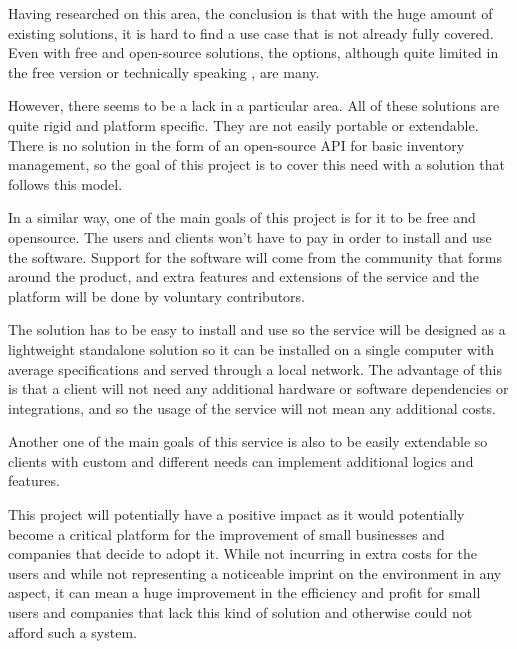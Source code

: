 Having researched on this area, the conclusion is that with the huge amount of existing solutions, it is hard to find a use case that is not already fully covered. Even with free and open-source solutions, the options, although quite limited \cite{4,5} in the free version or technically speaking \cite{6}, are many.

However, there seems to be a lack in a particular area. All of these solutions are quite rigid and platform specific. They are not easily portable or extendable. There is no solution in the form of an open-source API for basic inventory management, so the goal of this project is to cover this need with a solution that follows this model.

In a similar way, one of the main goals of this project is for it to be free and opensource. The users and clients won't have to pay in order to install and use the software. Support for the software will come from the community that forms around the product, and extra features and extensions of the service and the platform will be done by voluntary contributors.

The solution has to be easy to install and use so the service will be designed as a lightweight standalone solution so it can be installed on a single computer with average specifications and served through a local network. The advantage of this is that a client will not need any additional hardware or software dependencies or integrations, and so the usage of the service will not mean any additional costs.

Another one of the main goals of this service is also to be easily extendable so clients with custom and different needs can implement additional logics and features.

This project will potentially have a positive impact as it would potentially become a critical platform for the improvement of small businesses and companies that decide to adopt it. While not incurring in extra costs for the users and while not representing a noticeable imprint on the environment in any aspect, it can mean a huge improvement in the efficiency and profit for small users and companies that lack this kind of solution and otherwise could not afford such a system.